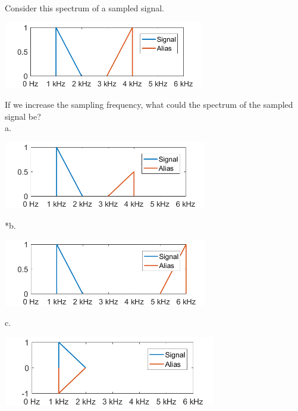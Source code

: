
Consider this spectrum of a sampled signal.

\includegraphics[width=3.45859in,height=1.14589in]{../../Images/SamplingAndAliasingQ5.png}

If we increase the sampling frequency, what could the spectrum of the sampled signal be? \\

a. 

\includegraphics[width=3.49509in,height=1.15798in]{../../Images/SamplingAndAliasingQ5a.png}


*b.

\includegraphics[width=3.50764in,height=1.16214in]{../../Images/SamplingAndAliasingQ5b.png}


c. 

\includegraphics[width=3.64527in,height=1.20774in]{../../Images/SamplingAndAliasingQ5c.png}

